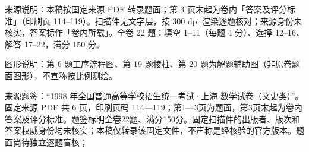 

\begin{gktip}
来源说明：本稿按固定来源 PDF 转录题面；第 3 页末起为卷内「答案及评分标准」（印刷页 114–119）。扫描件无文字层，按 300 dpi 渲染逐题核对；来源身份未核实，答案标作「卷内所载」。全卷 22 题：填空 1–11（每题 4 分）、选择 12–16、解答 17–22，满分 150 分。

图形说明：第 6 题工序流程图、第 19 题棱柱、第 20 题为解题辅助图（非原卷题面图形），不宣称按比例测绘。
\end{gktip}

来源题签：“1998 年全国普通高等学校招生统一考试·上海 数学试卷（文史类）”。固定来源 PDF 共 6 页，印刷页码 114—119；第1—3页为题面，第3页末起为卷内答案及评分标准。题签标明全卷22题、满分150分。固定扫描件的出版者、版次和答案权威身份均未核实；本稿仅转录该固定文件，不声称是经核验的官方版本。题面尚待独立逐题盲核；


